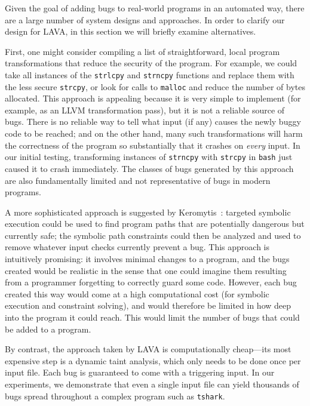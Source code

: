 Given the goal of adding bugs to real-world programs in an automated way, there are a large number of system designs and approaches.
In order to clarify our design for LAVA, in this section we will briefly examine alternatives.

First, one might consider compiling a list of straightforward, local program transformations that reduce the security of the program. 
For example, we could take all instances of the \texttt{strlcpy} and \texttt{strncpy} functions and replace them with the less secure \texttt{strcpy}, or look for calls to \texttt{malloc} and reduce the number of bytes allocated.
This approach is appealing because it is very simple to implement (for example, as an LLVM transformation pass), but it is not a reliable source of bugs.
There is no reliable way to tell what input (if any) causes the newly buggy code to be reached; and on the other hand, many such transformations will harm the correctness of the program so substantially that it crashes on \emph{every} input.
In our initial testing, transforming instances of \texttt{strncpy} with \texttt{strcpy} in \texttt{bash} just caused it to crash immediately.
The classes of bugs generated by this approach are also fundamentally limited and not representative of bugs in modern programs.

A more sophisticated approach is suggested by Keromytis~\cite{Keromytis:2015}: targeted symbolic execution could be used to find program paths that are potentially dangerous but currently safe; the symbolic path constraints could then be analyzed and used to remove whatever input checks currently prevent a bug. 
This approach is intuitively promising: it involves minimal changes to a program, and the bugs created would be realistic in the sense that one could imagine them resulting from a programmer forgetting to correctly guard some code. 
However, each bug created this way would come at a high computational cost (for symbolic execution and constraint solving), and would therefore be limited in how deep into the program it could reach.
This would limit the number of bugs that could be added to a program.

By contrast, the approach taken by LAVA is computationally cheap---its most expensive step is a dynamic taint analysis, which only needs to be done once per input file. 
Each bug is guaranteed to come with a triggering input. 
In our experiments, we demonstrate that even a single input file can yield thousands of bugs spread throughout a complex program such as \texttt{tshark}.
